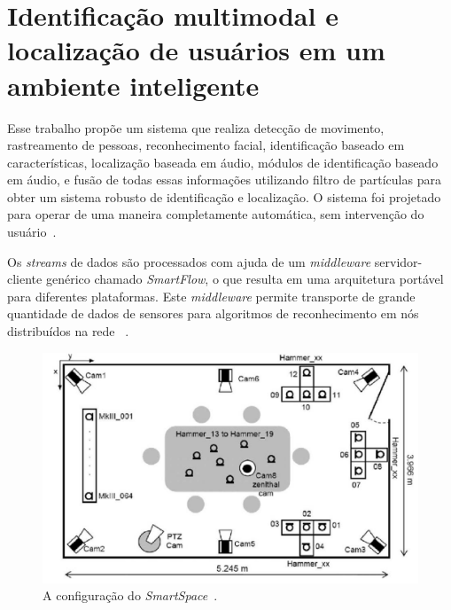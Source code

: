 
\section{Identificação multimodal e localização de usuários em um ambiente inteligente}

Esse trabalho propõe um sistema que realiza detecção de movimento, rastreamento de pessoas, reconhecimento facial, identificação baseado em características, localização baseada em áudio, módulos de identificação baseado em áudio, e fusão de todas essas informações utilizando filtro de partículas para obter um sistema robusto de identificação e localização. O sistema foi projetado para operar de uma maneira completamente automática, sem intervenção do usuário~\cite{salah}.

Os \textit{streams} de dados são processados com ajuda de um \textit{middleware} servidor-cliente genérico chamado \textit{SmartFlow}, o que resulta em uma arquitetura portável para diferentes plataformas. Este \textit{middleware} permite transporte de grande quantidade de dados de sensores para algoritmos de reconhecimento em nós distribuídos na rede ~\cite{salah}.

	\begin{figure}[hbt]
		\begin{center}
			\includegraphics[scale=0.4]{figuras/3.TrabalhosCorrelatos/upc.png}
		\end{center}
		\caption{A configuração do \textit{SmartSpace}~\cite{salah}.}
		\label{upc}
	\end{figure}

